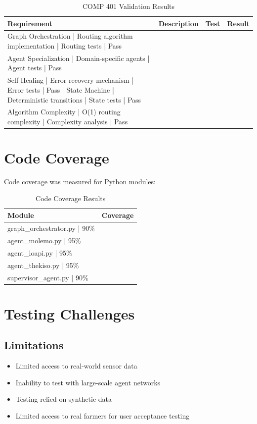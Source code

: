 \begin{table}[H]
\centering
\begin{tabular}{|l|l|l|l|}
\hline
\textbf{Requirement} & \textbf{Description} & \textbf{Test} & \textbf{Result} \\
\hline
Graph Orchestration | Routing algorithm implementation | Routing tests | Pass \\
Agent Specialization | Domain-specific agents | Agent tests | Pass \\
Self-Healing | Error recovery mechanism | Error tests | Pass |
State Machine | Deterministic transitions | State tests | Pass \\
Algorithm Complexity | O(1) routing complexity | Complexity analysis | Pass \\
\hline
\end{tabular}
\caption{COMP 401 Validation Results}
\end{table}

\section{Code Coverage}

Code coverage was measured for Python modules:

\begin{table}[H]
\centering
\begin{tabular}{|l|l|}
\hline
\textbf{Module} & \textbf{Coverage} \\
\hline
graph\_orchestrator.py | 90\% \\
agent\_molemo.py | 95\% \\
agent\_loapi.py | 95\% \\
agent\_thekiso.py | 95\% \\
supervisor\_agent.py | 90\% \\
\hline
\end{tabular}
\caption{Code Coverage Results}
\end{table}

\section{Testing Challenges}

\subsection{Limitations}

\begin{itemize}
    \item Limited access to real-world sensor data
    \item Inability to test with large-scale agent networks
    \item Testing relied on synthetic data
    \item Limited access to real farmers for user acceptance testing
\end{itemize}


